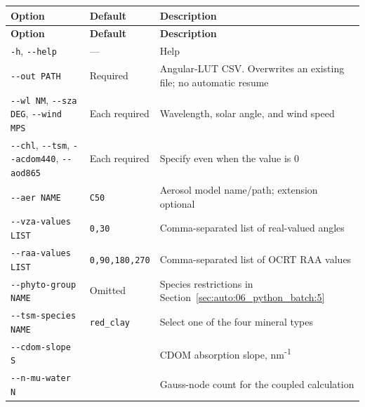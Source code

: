 {\TableFont
\begin{longtable}{@{}>{\raggedright\arraybackslash}p{}>{\raggedright\arraybackslash}p{}>{\raggedright\arraybackslash}p{}@{}}
\toprule
\textbf{Option} & \textbf{Default} & \textbf{Description} \\
\midrule
\endfirsthead
\toprule
\textbf{Option} & \textbf{Default} & \textbf{Description} \\
\midrule
\endhead
\bottomrule
\endfoot
\texttt{-\allowbreak{}h}, \texttt{-\allowbreak{}-\allowbreak{}help} & --- & Help \\
\texttt{-\allowbreak{}-\allowbreak{}out PATH} & Required & Angular-LUT CSV. Overwrites an existing file; no automatic resume \\
\texttt{-\allowbreak{}-\allowbreak{}wl NM}, \texttt{-\allowbreak{}-\allowbreak{}sza DEG}, \texttt{-\allowbreak{}-\allowbreak{}wind MPS} & Each required & Wavelength, solar angle, and wind speed \\
\texttt{-\allowbreak{}-\allowbreak{}chl}, \texttt{-\allowbreak{}-\allowbreak{}tsm}, \texttt{-\allowbreak{}-\allowbreak{}acdom440}, \texttt{-\allowbreak{}-\allowbreak{}aod865} & Each required & Specify even when the value is 0 \\
\texttt{-\allowbreak{}-\allowbreak{}aer NAME} & \texttt{C50} & Aerosol model name/path; extension optional \\
\texttt{-\allowbreak{}-\allowbreak{}vza-\allowbreak{}values LIST} & \texttt{0,\allowbreak{}30} & Comma-separated list of real-valued angles \\
\texttt{-\allowbreak{}-\allowbreak{}raa-\allowbreak{}values LIST} & \texttt{0,\allowbreak{}90,\allowbreak{}180,\allowbreak{}270} & Comma-separated list of OCRT RAA values \\
\texttt{-\allowbreak{}-\allowbreak{}phyto-\allowbreak{}group NAME} & Omitted & Species restrictions in Section~\ref{sec:auto:06_python_batch:5} \\
\texttt{-\allowbreak{}-\allowbreak{}tsm-\allowbreak{}species NAME} & \texttt{red\_\allowbreak{}clay} & Select one of the four mineral types \\
\texttt{-\allowbreak{}-\allowbreak{}cdom-\allowbreak{}slope S} & 0.014 & CDOM absorption slope, nm\textsuperscript{-}\textsuperscript{1} \\
\texttt{-\allowbreak{}-\allowbreak{}n-\allowbreak{}mu-\allowbreak{}water N} & 48 & Gauss-node count for the coupled calculation \\

\end{longtable}}
